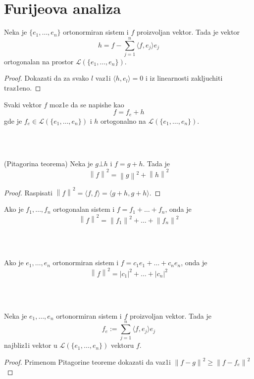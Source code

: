 \documentclass[a4paper,12pt]{article}
\newcommand{\norm}[1]{\left\lVert#1\right\rVert}
\begin{document}
\section{Furijeova analiza}

\begin{lema}
Neka je $\{e_1, \dots, e_n\}$ ortonormiran sistem i $f$ proizvoljan vektor. Tada je vektor 
\[h = f - \sum_{j=1}^n \langle f, e_j \rangle e_j\]
ortogonalan na prostor $\mathcal{L}(\{e_1, \dots, e_n\})$.
\end{lema}
\begin{proof}
Dokazati da za svako $l$ vaz1i $\langle h, e_l \rangle = 0$ i iz linearnosti zakljuchiti traz1eno.
\end{proof}

\begin{posl}
Svaki vektor $f$ moz1e da se napishe kao 
\[f = f_e + h\]
gde je $f_e \in \mathcal{L}(\{e_1, \dots, e_n \})$ i $h$ ortogonalno na $\mathcal{L}(\{e_1, \dots, e_n \})$.
\end{posl}
\\ \\
\begin{lema}
(Pitagorina teorema) Neka je $g\bot h$ i $f = g+h$. Tada je \[\norm{f}^2 = \norm{g}^2 + \norm{h}^2\]
\end{lema}
\begin{proof}
Raspisati $\norm{f}^2 = \langle f, f \rangle = \langle g+h, g+h \rangle $.
\end{proof}

\begin{posl}
Ako je $f_1, \dots, f_n$ ortogonalan sistem i $f = f_1 + \dots + f_n$, onda je 
\[\norm{f}^2 = \norm{f_1}^2 + \dots + \norm{f_n}^2 \]
\end{posl}
\\ \\
\begin{posl}
Ako je $e_1, \dots , e_n$ ortonormiran sistem i $f = c_1 e_1 + \dots + c_n e_n$, onda je 
\[\norm{f}^2 = {|c_1|}^2 + \dots + {|c_n|}^2\]
\end{posl}
\\ \\
\begin{tvr}
Neka je $e_1, \dots , e_n$ ortonormiran sistem i $f$ proizvoljan vektor. Tada je \[f_e := \sum_{j=1}^n \langle f, e_j \rangle e_j\] najbliz1i vektor u $\mathcal{L}(\{e_1, \dots, e_n \})$ vektoru $f$.
\end{tvr}
\begin{proof}
Primenom Pitagorine teoreme dokazati da vaz1i $\norm{f-g}^2 \geq \norm{f - f_e}^2$
\end{proof}
\end{document}
